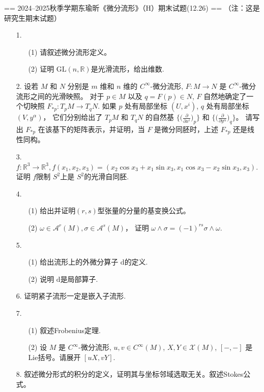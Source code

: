 == 2024--2025秋季学期东瑜昕《微分流形》（H）期末试题(12.26) ==
（注：这是研究生期末试题）
\begin{itemize}
    \item[1.]
    \begin{enumerate}
        \item[(1)]请叙述微分流形定义。
        \item[(2)]证明 $\mathrm{GL}(n,\mathbb{R})$是光滑流形，给出维数.
    \end{enumerate}
    \item[2.]设若 $M$ 和 $N$ 分别是 $m$ 维和 $n$ 维的 $C^{\infty}$-微分流形, 
$F: M \rightarrow N$ 是 $C^{\infty}$-微分流形之间的光滑映照。
对于 $p \in M$ 以及 $q=F(p) \in N$, $F$ 自然地确定了一个切映照 $F_{*p}: T_{p} M \rightarrow T_{q} N$.
如果 $p$ 处有局部坐标 $\left(U, x^{i}\right)$, $q$ 处有局部坐标 $\left(V, y^{\alpha}\right)$，
它们分别给出了 $T_{p} M$ 和 $T_{q} N$ 的自然基 $\big\{\big(\frac{\partial}{\partial x^i}\big)_{p}\big\}$ 和 $\big\{\big(\frac{\partial}{\partial y^\alpha}\big)_{q}\big\}$。
请写出 $F_{*p}$ 在该基下的矩阵表示，并证明，当 $F$ 是微分同胚时，上述 $F_{*p}$ 还是线性同构。
    \item[3.]$f:\mathbb{R}^3\to\mathbb{R}^3,f(x_1, x_2, x_3)=(x_2\cos x_3+x_1\sin x_3, x_1\cos x_3-x_2\sin x_3, x_3)$.证明 $f$限制 $S^2$上是 $S^2$的光滑自同胚.
    \item[4.]
    \begin{enumerate}
        \item[(1)]给出并证明$(r,s)$型张量的分量的基变换公式。
        \item[(2)] $\omega \in \mathcal{A}^r(M),\sigma \in \mathcal{A}^s(M)$，
        证明 $\omega \wedge \sigma=(-1)^{rs}\sigma \wedge \omega$.
    \end{enumerate}
    \item[5.]
    \begin{enumerate}
        \item[(1)]给出流形上的外微分算子 $\mathrm{d}$的定义.
        \item[(2)]说明 $\mathrm{d}$是局部算子.
    \end{enumerate}
    \item[6.]证明紧子流形一定是嵌入子流形.
    \item[7.]
    \begin{enumerate}
        \item[(1)]叙述Frobenius定理.
        \item[(2)]设 $M$ 是 $C^{\infty}$-微分流形, $u, v \in C^{\infty}(M)$, 
        $X, Y \in \mathscr{X}(M)$, $[-,-]$ 是Lie括号。请展开 $[u X, v Y]$.
    \end{enumerate}
    \item[8.]    叙述微分形式的积分的定义，证明其与坐标邻域选取无关。叙述Stokes公式。
\end{itemize}

